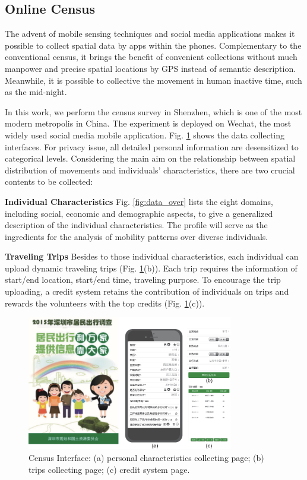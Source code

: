 \documentclass{ieeeaccess}
\begin{document}
\subsection{Online Census}

The advent of mobile sensing techniques and social media applications makes it possible to collect spatial data by apps within the phones. Complementary to the conventional census, it brings the benefit of convenient collections without much manpower and precise spatial locations by GPS instead of semantic description. Meanwhile, it is possible to collective the movement in human inactive time, such as the mid-night.

In this work, we perform the census survey in Shenzhen, which is one of the most modern metropolis in China. The experiment is deployed on Wechat, the most widely used social media mobile application. Fig. \ref{fig:app} shows the data collecting interfaces. For privacy issue, all detailed personal information are desensitized to categorical levels. Considering the main aim on the relationship between spatial distribution of movements and individuals' characteristics, there are two crucial contents to be collected:

\textbf{Individual Characteristics} Fig. \ref{fig:data_over} lists the eight domains, including social, economic and demographic aspects, to give a generalized description of the individual characteristics. The profile will serve as the ingredients for the analysis of mobility patterns over diverse individuals.

\textbf{Traveling Trips} Besides to those individual characteristics, each individual can upload dynamic traveling trips (Fig. \ref{fig:app}(b)). Each trip requires the information of start/end location, start/end time, traveling purpose. To encourage the trip uploading, a credit system retains the contribution of individuals on trips and rewards the volunteers with the top credits (Fig. \ref{fig:app}(c)).


\begin{figure}
 \centering
 \includegraphics[width=9cm]{pictures/survey_app}
  \captionsetup{justification=centering}
 \caption{Census Interface: (a) personal characteristics collecting page; (b) trips collecting page; (c) credit system page.}
 \label{fig:app}
\end{figure}
\end{document}
